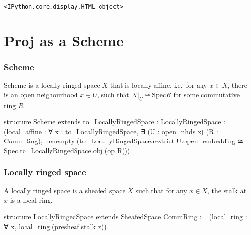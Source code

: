 \documentclass[11pt]{article}
\makeatletter
\newenvironment{Shaded}{}{}
\newcommand{\NormalTok}[1]{{#1}}
\newcommand{\boxspacing}{\kern\kvtcb@left@rule\kern\kvtcb@boxsep}
\newcommand{\prompt}[4]{
        \ttfamily\llap{{\color{#2}[#3]:\hspace{3pt}#4}}\vspace{-\baselineskip}
    }
\makeatother
\begin{document}
            \begin{tcolorbox}[breakable, size=fbox, boxrule=.5pt, pad at break*=1mm, opacityfill=0]
\prompt{Out}{outcolor}{2}{\boxspacing}
\begin{Verbatim}[commandchars=\\\{\}]
<IPython.core.display.HTML object>
\end{Verbatim}
\end{tcolorbox}
        
    \hypertarget{proj-as-a-scheme}{%
\section{Proj as a Scheme}\label{proj-as-a-scheme}}

    \hypertarget{scheme}{%
\subsubsection{Scheme}\label{scheme}}

Scheme is a locally ringed space \(X\) that is locally affine, i.e.~for
any \(x\in X\), there is an open neighourhood \(x\in U\), such that
\(X|_U \cong \mathrm{Spec} R\) for some commutative ring \(R\)

\begin{Shaded}
\begin{Highlighting}[]
\NormalTok{structure Scheme extends to\_LocallyRingedSpace : LocallyRingedSpace :=}
\NormalTok{(local\_affine : ∀ x : to\_LocallyRingedSpace, }
\NormalTok{    ∃ (U : open\_nhds x) (R : CommRing), nonempty }
\NormalTok{        (to\_LocallyRingedSpace.restrict U.open\_embedding ≅ }
\NormalTok{        Spec.to\_LocallyRingedSpace.obj (op R)))}
\end{Highlighting}
\end{Shaded}

    \hypertarget{locally-ringed-space}{%
\subsubsection{Locally ringed space}\label{locally-ringed-space}}

A locally ringed space is a sheafed space \(X\) such that for any
\(x\in X\), the stalk at \(x\) is a local ring.

\begin{Shaded}
\begin{Highlighting}[]
\NormalTok{structure LocallyRingedSpace extends SheafedSpace CommRing :=}
\NormalTok{(local\_ring : ∀ x, local\_ring (presheaf.stalk x))}
\end{Highlighting}
\end{Shaded}
\end{document}
